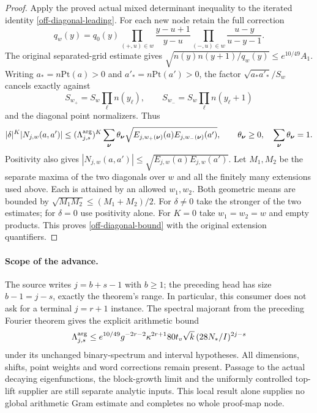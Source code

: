\begin{proof}
Apply the proved actual mixed determinant inequality
to the iterated identity \eqref{off-diagonal-leading}.
For each new node retain the full correction
\[
 q_w(y)=q_0(y)
 \prod_{(+,u)\in w}\frac{y-u+1}{y-u}
 \prod_{(-,u)\in w}\frac{u-y}{u-y-1}.
\]
The original separated-grid estimate gives
$\sqrt{n(y)n(y+1)/q_w(y)}\le e^{10/49}A_1$.
Writing $a_*=n\mathrm{Pt}(a)>0$ and
$a'_* =n\mathrm{Pt}(a')>0$, the factor
$\sqrt{a_*a'_*}/S_w$ cancels exactly against
\[
 S_{w_+}=S_w\prod_\ell n(y_\ell),\qquad
 S_{w_-}=S_w\prod_\ell n(y_\ell+1)
\]
and the diagonal point normalizers.  Thus
\[
 |\delta|^K|N_{j,w}(a,a')|
 \le(\Lambda_{j,s}^{\rm arg})^K
   \sum_{\boldsymbol\nu}\theta_{\boldsymbol\nu}
       \sqrt{E_{j,w_+(\boldsymbol\nu)}(a)
             E_{j,w_-(\boldsymbol\nu)}(a')},
 \qquad
 \theta_{\boldsymbol\nu}\ge0,\quad
 \sum_{\boldsymbol\nu}\theta_{\boldsymbol\nu}=1.
\]
Positivity also gives
$|N_{j,w}(a,a')|\le\sqrt{E_{j,w}(a)E_{j,w}(a')}$.
Let $M_1,M_2$ be the separate maxima of the two
diagonals over $w$ and all the finitely many
extensions used above.  Each is attained by an
allowed $w_1,w_2$.  Both geometric means are bounded
by $\sqrt{M_1M_2}\le(M_1+M_2)/2$.
For $\delta\ne0$ take the stronger of the two
estimates; for $\delta=0$ use positivity alone.
For $K=0$ take $w_1=w_2=w$ and empty products.
This proves \eqref{off-diagonal-bound} with the
original extension quantifiers.
\end{proof}

\paragraph{Scope of the advance.}
The source writes $j=b+s-1$ with $b\ge1$;
the preceding head has size $b-1=j-s$, exactly
the theorem's range.  In particular, this consumer
does not ask for a terminal $j=r+1$ instance.
The spectral majorant from the preceding Fourier
theorem gives the explicit arithmetic bound
\[
 \Lambda_{j,s}^{\rm arg}
 \le e^{10/49}g^{-2r-2}\kappa^{2r+1}
      80t_v\sqrt{k}\,(28N_*/I)^{2j-s}
\]
under its unchanged binary-spectrum and interval
hypotheses.  All dimensions, shifts, point weights
and word corrections remain present.  Passage to
the actual decaying eigenfunctions, the block-growth
limit and the uniformly controlled top-lift supplier
are still separate analytic inputs.  This local
result alone supplies no global arithmetic Gram
estimate and completes no whole proof-map node.
